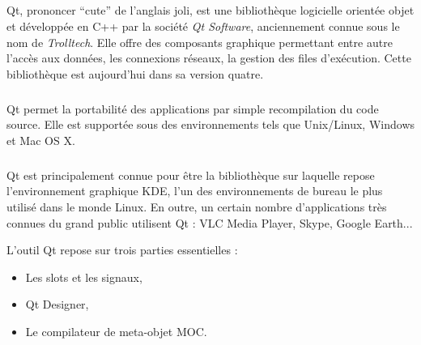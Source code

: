 \subparagraph{}
Qt, prononcer ``cute'' de l'anglais joli, est une biblioth\`eque logicielle orient\'ee objet et d\'evelopp\'ee en C++ par la soci\'et\'e \textit{Qt Software}, anciennement connue sous le nom de \textit{Trolltech}. Elle offre des composants graphique permettant entre autre l'acc\`es aux donn\'ees, les connexions r\'eseaux, la gestion des files d'ex\'ecution. Cette biblioth\`eque est aujourd'hui dans sa version quatre.
\subparagraph{}
Qt permet la portabilit\'e des applications par simple recompilation du code source. Elle est support\'ee sous des environnements tels que Unix/Linux, Windows et Mac OS X.
\subparagraph{}
Qt est principalement connue pour \^etre la biblioth\`eque sur laquelle repose l'environnement graphique KDE, l'un des environnements de bureau le plus utilis\'e dans le monde Linux. En outre, un certain nombre d'applications tr\`es connues du grand public utilisent Qt : VLC Media Player, Skype, Google Earth...

\par
L'outil Qt repose sur trois parties essentielles : 
\begin{itemize}
	\item Les slots et les signaux,
	\item Qt Designer,
	\item Le compilateur de meta-objet MOC.
\end{itemize}

